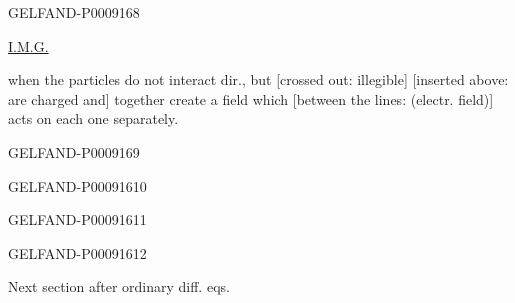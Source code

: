 \begin{GelfandAdjacentEvidence}{GELFAND-P000916}{8}


\uline{I.M.G.}\quad {}

when the particles do not interact dir., but
[crossed out: illegible]
[inserted above: are charged and] together create a field which
[between the lines: (electr. field)]
acts on each one separately.

\end{GelfandAdjacentEvidence}
\begin{GelfandAdjacentEvidence}{GELFAND-P000916}{9}

\end{GelfandAdjacentEvidence}
\begin{GelfandAdjacentEvidence}{GELFAND-P000916}{10}

\end{GelfandAdjacentEvidence}
\begin{GelfandAdjacentEvidence}{GELFAND-P000916}{11}

\end{GelfandAdjacentEvidence}
\begin{GelfandAdjacentEvidence}{GELFAND-P000916}{12}


Next section after ordinary diff. eqs.
\end{GelfandAdjacentEvidence}



